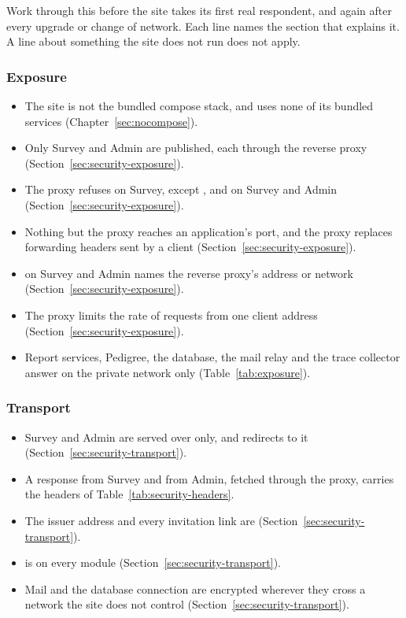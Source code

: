 \documentclass[11pt, a4paper]{article}
\newcommand{\elicitcheck}{\raisebox{-0.12em}{\setlength{\fboxsep}{0pt}\fbox{\rule{0pt}{0.72em}\hspace{0.72em}}}}
\begin{document}
Work through this before the site takes its first real respondent, and again after every
upgrade or change of network. Each line names the section that explains it. A line about
something the site does not run does not apply.

\subsubsection*{Exposure}
\begin{itemize}[label = \elicitcheck]
  \item The site is not the bundled compose stack, and uses none of its bundled services
        (Chapter~\ref{sec:nocompose}).
  \item Only Survey and Admin are published, each through the reverse proxy
        (Section~\ref{sec:security-exposure}).
  \item The proxy refuses  on Survey, except , and  on
        Survey and Admin (Section~\ref{sec:security-exposure}).
  \item Nothing but the proxy reaches an application's port, and the proxy replaces forwarding
        headers sent by a client (Section~\ref{sec:security-exposure}).
  \item {} on Survey and Admin names the reverse proxy's address or
        network (Section~\ref{sec:security-exposure}).
  \item The proxy limits the rate of requests from one client address
        (Section~\ref{sec:security-exposure}).
  \item Report services, Pedigree, the database, the mail relay and the trace collector answer
        on the private network only (Table~\ref{tab:exposure}).
\end{itemize}

\subsubsection*{Transport}
\begin{itemize}[label = \elicitcheck]
  \item Survey and Admin are served over  only, and  redirects to it
        (Section~\ref{sec:security-transport}).
  \item A response from Survey and from Admin, fetched through the proxy, carries the headers
        of Table~\ref{tab:security-headers}.
  \item The issuer address and every invitation link are 
        (Section~\ref{sec:security-transport}).
  \item {} is  on every module
        (Section~\ref{sec:security-transport}).
  \item Mail and the database connection are encrypted wherever they cross a network the site
        does not control (Section~\ref{sec:security-transport}).
\end{itemize}
\end{document}
